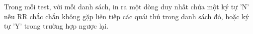 Trong mỗi test, với mỗi danh sách, in ra một dòng duy nhất chứa một ký tự 'N' nếu RR chắc chắn không gặp liên tiếp các quái thú trong danh sách đó, hoặc ký tự 'Y' trong trường hợp ngược lại.